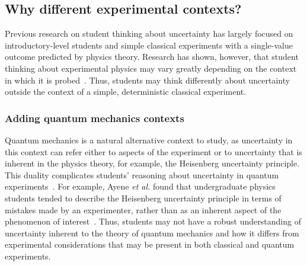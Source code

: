 \documentclass[english,aps,prstper,reprint,showpacs,longbibliography,superscriptaddress,nofootinbib]{revtex4-2}
\begin{document}
\subsection{Why different experimental contexts?}
\label{sec:variables}

Previous research on student thinking about uncertainty has largely focused on introductory-level students and simple classical experiments with a single-value outcome predicted by physics theory. Research has shown, however, that student thinking about experimental physics may vary greatly depending on the context in which it is probed~\cite{Leach2000}. Thus, students may think differently about uncertainty outside the context of a simple, deterministic classical experiment.

\subsubsection{Adding quantum mechanics contexts}

Quantum mechanics is a natural alternative context to study, as uncertainty in this context can refer either to aspects of the experiment or to uncertainty that is inherent in the physics theory, for example, the Heisenberg uncertainty principle. This duality complicates students' reasoning about uncertainty in quantum experiments~\cite{Ayene2011,KrijtenburgLewerissa2017,Singh2015,Zhu2012a,Bouchee2022,Johnston1998}. For example, Ayene \textit{et al.} found that undergraduate physics students tended to describe the Heisenberg uncertainty principle in terms of mistakes made by an experimenter, rather than as an inherent aspect of the phenomenon of interest~\cite{Ayene2011}. Thus, students may not have a robust understanding of uncertainty inherent to the theory of quantum mechanics and how it differs from experimental considerations that may be present in both classical and quantum experiments. 


\end{document}
